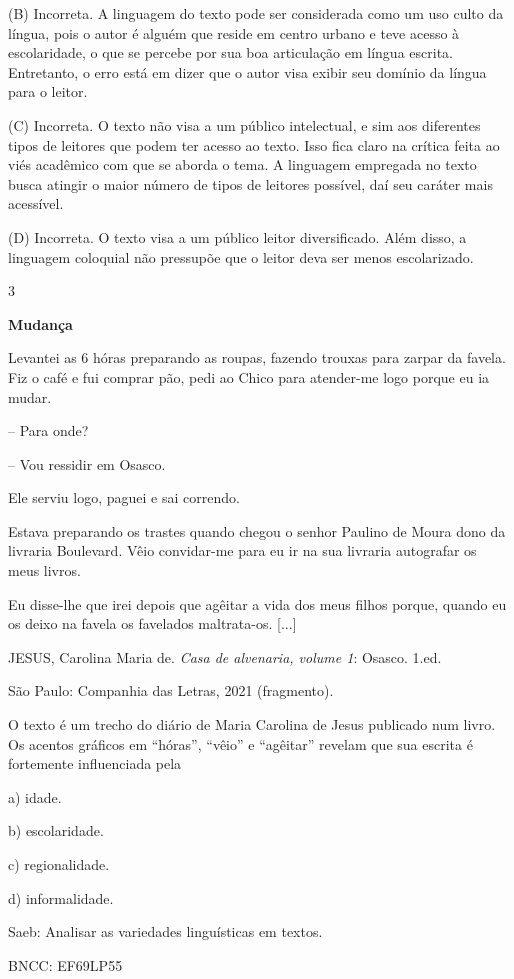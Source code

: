 (B) Incorreta. A linguagem do texto pode ser considerada como um uso
culto da língua, pois o autor é alguém que reside em centro urbano e
teve acesso à escolaridade, o que se percebe por sua boa articulação em
língua escrita. Entretanto, o erro está em dizer que o autor visa exibir
seu domínio da língua para o leitor.

(C) Incorreta. O texto não visa a um público intelectual, e sim aos
diferentes tipos de leitores que podem ter acesso ao texto. Isso fica
claro na crítica feita ao viés acadêmico com que se aborda o tema. A
linguagem empregada no texto busca atingir o maior número de tipos de
leitores possível, daí seu caráter mais acessível.

(D) Incorreta. O texto visa a um público leitor diversificado. Além
disso, a linguagem coloquial não pressupõe que o leitor deva ser menos
escolarizado.

\num{3}

\textbf{Mudança}

Levantei as 6 hóras preparando as roupas, fazendo trouxas para zarpar da
favela. Fiz o café e fui comprar pão, pedi ao Chico para atender-me logo
porque eu ia mudar.

-- Para onde?

-- Vou ressidir em Osasco.

Ele serviu logo, paguei e sai correndo.

Estava preparando os trastes quando chegou o senhor Paulino de Moura
dono da livraria Boulevard. Vêio convidar-me para eu ir na sua livraria
autografar os meus livros.

Eu disse-lhe que irei depois que agêitar a vida dos meus filhos porque,
quando eu os deixo na favela os favelados maltrata-os. {[}...{]}

JESUS, Carolina Maria de. \emph{Casa de alvenaria, volume 1}: Osasco.
1.ed.

São Paulo: Companhia das Letras, 2021 (fragmento).

O texto é um trecho do diário de Maria Carolina de Jesus publicado num
livro. Os acentos gráficos em ``hóras'', ``vêio'' e ``agêitar'' revelam
que sua escrita é fortemente influenciada pela

a) idade.

b) escolaridade.

c) regionalidade.

d) informalidade.

Saeb: Analisar as variedades linguísticas em textos.

BNCC: EF69LP55

